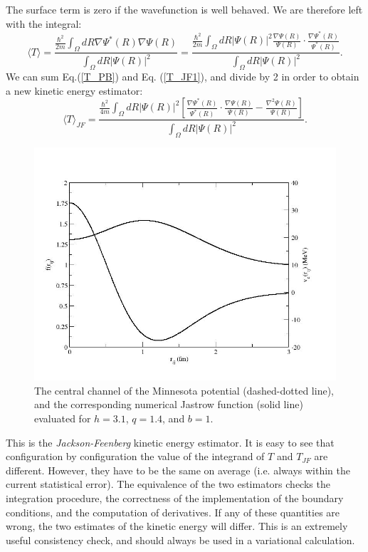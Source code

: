 The surface term is zero if the wavefunction is well behaved. We are therefore left with the integral:
\begin{equation}
\label{T_JF1}
\langle T\rangle = \frac{\displaystyle\frac{\hbar^2}{2m}\int_\Omega dR \nabla\Psi^*(R)\nabla\Psi(R)}{\displaystyle\int_\Omega dR |\Psi(R)|^2}= \frac{
	\displaystyle\frac{\hbar^2}{2m}\int_\Omega dR|\Psi(R)|^2 \frac{\nabla\Psi(R)}{\Psi(R)}\cdot
\frac{\nabla\Psi^*(R)}{\Psi^*(R)}
}{\displaystyle\int_\Omega dR |\Psi(R)|^2}.
\end{equation}
We can sum Eq.(\ref{T_PB}) and Eq. (\ref{T_JF1}), and divide by 2 in order to obtain a new kinetic energy estimator:
\begin{equation}
\langle T\rangle_{JF} = \frac{
	\displaystyle\frac{\hbar^2}{4m}\int_\Omega dR|\Psi(R)|^2 \left[\frac{\nabla\Psi^*(R)}{\Psi^*(R)}\cdot
	\frac{\nabla\Psi(R)}{\Psi(R)}-\frac{\nabla^2\Psi(R)}{\Psi(R)}\right]
}{\displaystyle\int_\Omega dR |\Psi(R)|^2}.
\end{equation}
\begin{figure}
	\begin{center}
		\includegraphics[scale=0.5]{Chapter9-figures/jas.jpg}
	\end{center}
	\caption{The central channel of the Minnesota potential (dashed-dotted line), and the corresponding numerical Jastrow function (solid line) evaluated for $h=3.1$, $q=1.4$, and $b=1$.}
	\label{fig.var}
\end{figure}
This is the {\it Jackson-Feenberg} kinetic energy estimator. It is easy to see that configuration by configuration the value of the integrand of $T$ and $T_{JF}$ are different. However, they have to be the same on average (i.e. always within the current statistical error). The equivalence of the two estimators checks the integration procedure, the correctness of the implementation of the boundary conditions, and the computation of derivatives. If any of these quantities are wrong, the two estimates of the kinetic energy will differ. This is an extremely useful consistency check, and should always be used in a variational calculation.

